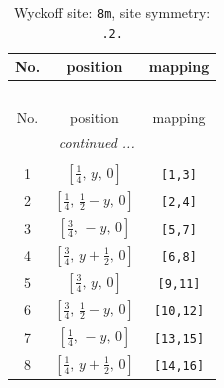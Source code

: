 \documentclass[fleqn,8pt]{jsarticle}
\begin{document}
\begin{longtable}{ccc}
\caption{Wyckoff site: {\tt 8m}, site symmetry: {\tt .2.}}
 \\
 \hline \hline
No. & position & mapping \\ \hline \endfirsthead

\multicolumn{2}{l}{\tablename\ \thetable{}} \\
 \hline \hline
No. & position & mapping \\ \hline \endhead

 \hline \hline
\multicolumn{2}{r}{\footnotesize\it continued ...} \\ \endfoot

 \hline \hline
\multicolumn{2}{r}{} \\ \endlastfoot

1 & $\left[ \frac{1}{4},\, y,\, 0 \right]$ & {\tt [1,3]} \\ \hline
2 & $\left[ \frac{1}{4},\, \frac{1}{2} - y,\, 0 \right]$ & {\tt [2,4]} \\ \hline
3 & $\left[ \frac{3}{4},\, - y,\, 0 \right]$ & {\tt [5,7]} \\ \hline
4 & $\left[ \frac{3}{4},\, y + \frac{1}{2},\, 0 \right]$ & {\tt [6,8]} \\ \hline
5 & $\left[ \frac{3}{4},\, y,\, 0 \right]$ & {\tt [9,11]} \\ \hline
6 & $\left[ \frac{3}{4},\, \frac{1}{2} - y,\, 0 \right]$ & {\tt [10,12]} \\ \hline
7 & $\left[ \frac{1}{4},\, - y,\, 0 \right]$ & {\tt [13,15]} \\ \hline
8 & $\left[ \frac{1}{4},\, y + \frac{1}{2},\, 0 \right]$ & {\tt [14,16]} \\
\end{longtable}
\renewcommand{\arraystretch}{1.2}
\end{document}
